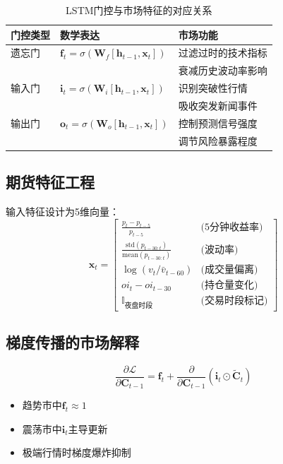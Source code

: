 \documentclass[a4paper,12pt]{ctexart}
\begin{document}
\begin{table}[h]
\centering
\caption{LSTM门控与市场特征的对应关系}
\begin{tabular}{lll}
\toprule
门控类型 & 数学表达 & 市场功能 \\
\midrule
遗忘门 & $\mathbf{f}_t=\sigma(\mathbf{W}_f[\mathbf{h}_{t-1},\mathbf{x}_t])$ & 过滤过时的技术指标 \\
 & & 衰减历史波动率影响 \\
输入门 & $\mathbf{i}_t=\sigma(\mathbf{W}_i[\mathbf{h}_{t-1},\mathbf{x}_t])$ & 识别突破性行情 \\
 & & 吸收突发新闻事件 \\
输出门 & $\mathbf{o}_t=\sigma(\mathbf{W}_o[\mathbf{h}_{t-1},\mathbf{x}_t])$ & 控制预测信号强度 \\
 & & 调节风险暴露程度 \\
\bottomrule
\end{tabular}
\end{table}

\subsection*{期货特征工程}
输入特征设计为5维向量：
\begin{equation*}
\mathbf{x}_t = \begin{bmatrix}
\frac{p_t - p_{t-5}}{p_{t-5}} & \text{(5分钟收益率)} \\
\frac{\text{std}(p_{t-30:t})}{\text{mean}(p_{t-30:t})} & \text{(波动率)} \\
\log(v_t/\bar{v}_{t-60}) & \text{(成交量偏离)} \\
oi_t - oi_{t-30} & \text{(持仓量变化)} \\
\mathbb{I}_{\text{夜盘时段}} & \text{(交易时段标记)}
\end{bmatrix}
\end{equation*}

\subsection*{梯度传播的市场解释}
\begin{minipage}[t]{0.6\linewidth}
\begin{equation*}
\frac{\partial \mathcal{L}}{\partial \mathbf{C}_{t-1}} = \mathbf{f}_t + \frac{\partial}{\partial \mathbf{C}_{t-1}}(\mathbf{i}_t \odot \tilde{\mathbf{C}}_t)
\end{equation*}
\end{minipage}
\begin{minipage}[t]{0.35\linewidth}
\begin{itemize}
\item 趋势市中$\mathbf{f}_t \approx 1$
\item 震荡市中$\mathbf{i}_t$主导更新
\item 极端行情时梯度爆炸抑制
\end{itemize}
\end{minipage}
\end{document}
